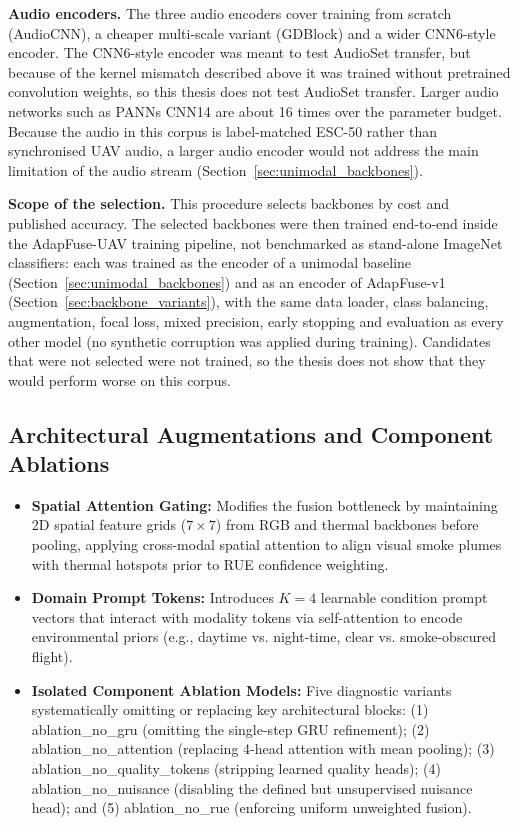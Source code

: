 \textbf{Audio encoders.} The three audio encoders cover training from scratch (AudioCNN), a cheaper multi-scale variant (GDBlock) and a wider CNN6-style encoder. The CNN6-style encoder was meant to test AudioSet transfer, but because of the kernel mismatch described above it was trained without pretrained convolution weights, so this thesis does not test AudioSet transfer. Larger audio networks such as PANNs CNN14 are about 16 times over the parameter budget. Because the audio in this corpus is label-matched ESC-50 rather than synchronised UAV audio, a larger audio encoder would not address the main limitation of the audio stream (Section~\ref{sec:unimodal_backbones}).

\textbf{Scope of the selection.} This procedure selects backbones by cost and published accuracy. The selected backbones were then trained end-to-end inside the AdapFuse-UAV training pipeline, not benchmarked as stand-alone ImageNet classifiers: each was trained as the encoder of a unimodal baseline (Section~\ref{sec:unimodal_backbones}) and as an encoder of AdapFuse-v1 (Section~\ref{sec:backbone_variants}), with the same data loader, class balancing, augmentation, focal loss, mixed precision, early stopping and evaluation as every other model (no synthetic corruption was applied during training). Candidates that were not selected were not trained, so the thesis does not show that they would perform worse on this corpus.

\subsection{Architectural Augmentations and Component Ablations}

\begin{itemize}
    \item \textbf{Spatial Attention Gating:} Modifies the fusion bottleneck by maintaining 2D spatial feature grids ($7 \times 7$) from RGB and thermal backbones before pooling, applying cross-modal spatial attention to align visual smoke plumes with thermal hotspots prior to RUE confidence weighting.
    \item \textbf{Domain Prompt Tokens:} Introduces $K=4$ learnable condition prompt vectors that interact with modality tokens via self-attention to encode environmental priors (e.g., daytime vs. night-time, clear vs. smoke-obscured flight).
    \item \textbf{Isolated Component Ablation Models:} Five diagnostic variants systematically omitting or replacing key architectural blocks: (1) ablation\_no\_gru (omitting the single-step GRU refinement); (2) ablation\_no\_attention (replacing 4-head attention with mean pooling); (3) ablation\_no\_quality\_tokens (stripping learned quality heads); (4) ablation\_no\_nuisance (disabling the defined but unsupervised nuisance head); and (5) ablation\_no\_rue (enforcing uniform unweighted fusion).
\end{itemize}

